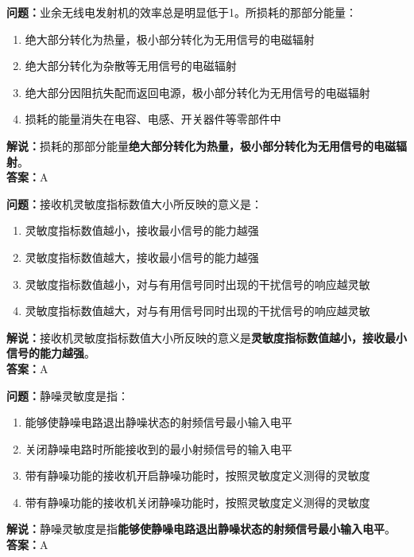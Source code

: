 \textbf{问题：}业余无线电发射机的效率总是明显低于1。所损耗的那部分能量：

\begin{enumerate}[label=\Alph*), leftmargin=1cm]
	\item 绝大部分转化为热量，极小部分转化为无用信号的电磁辐射
	\item 绝大部分转化为杂散等无用信号的电磁辐射
	\item 绝大部分因阻抗失配而返回电源，极小部分转化为无用信号的电磁辐射
	\item 损耗的能量消失在电容、电感、开关器件等零部件中
\end{enumerate}

\textbf{解说：}损耗的那部分能量\textbf{绝大部分转化为热量，极小部分转化为无用信号的电磁辐射}。\\\textbf{答案：}A%



\textbf{问题：}接收机灵敏度指标数值大小所反映的意义是：

\begin{enumerate}[label=\Alph*), leftmargin=1cm]
	\item 灵敏度指标数值越小，接收最小信号的能力越强
	\item 灵敏度指标数值越大，接收最小信号的能力越强
	\item 灵敏度指标数值越小，对与有用信号同时出现的干扰信号的响应越灵敏
	\item 灵敏度指标数值越大，对与有用信号同时出现的干扰信号的响应越灵敏
\end{enumerate}

\textbf{解说：}接收机灵敏度指标数值大小所反映的意义是\textbf{灵敏度指标数值越小，接收最小信号的能力越强}。\\\textbf{答案：}A%



\textbf{问题：}静噪灵敏度是指：

\begin{enumerate}[label=\Alph*), leftmargin=1cm]
	\item 能够使静噪电路退出静噪状态的射频信号最小输入电平
	\item 关闭静噪电路时所能接收到的最小射频信号的输入电平
	\item 带有静噪功能的接收机开启静噪功能时，按照灵敏度定义测得的灵敏度
	\item 带有静噪功能的接收机关闭静噪功能时，按照灵敏度定义测得的灵敏度
\end{enumerate}

\textbf{解说：}静噪灵敏度是指\textbf{能够使静噪电路退出静噪状态的射频信号最小输入电平}。\\\textbf{答案：}A%



